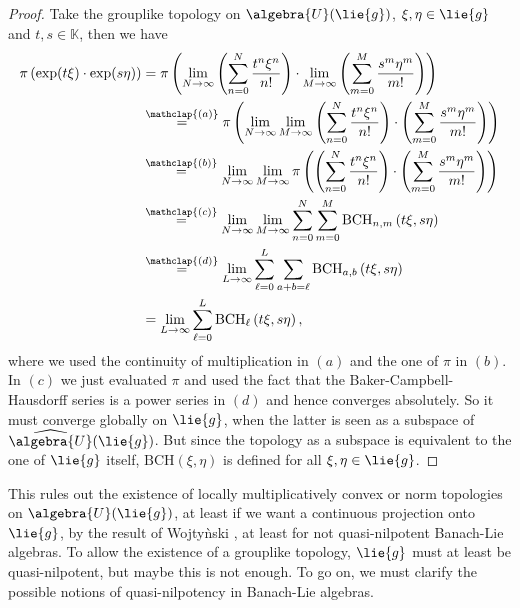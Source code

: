 \documentclass[
11pt,                          %
english                        %
]{article}
\newcommand{\bch}[2]{\mathrm{BCH}\left(#1, #2\right)}
\newcommand{\bchpart}[3]{\mathrm{BCH}_{#1}\left(#2, #3\right)}
\newcommand{\bchparts}[4]{\mathrm{BCH}_{#1, #2}\left(#3, #4\right)}
\newcommand\ot[2]{\stackrel{\mathclap{#1}}{#2}}
\begin{document}
\begin{proof}
	Take the grouplike topology on $\algebra{U}(\lie{g})$, $\xi, \eta \in \lie{g}$ 
	and $t,s \in \mathbb{K}$, then we have
	\begin{align*}
		\pi \left( \exp(t \xi) \cdot \exp(s \eta) \right)
		& =
		\pi
		\left(
			\lim_{N \rightarrow \infty}
			\left(
				\sum\limits_{n=0}^N
				\frac{t^n \xi^n}{n!}
			\right)
			\cdot
			\lim_{M \rightarrow \infty}
			\left(
				\sum\limits_{m=0}^M
				\frac{s^m \eta^m}{m!}
			\right)
		\right)
		\\
		& \ot{(a)}{=}
		\pi
		\left(
			\lim_{N \rightarrow \infty}
			\lim_{M \rightarrow \infty}
			\left(
				\sum\limits_{n=0}^N
				\frac{t^n \xi^n}{n!}
			\right)
			\cdot
			\left(
				\sum\limits_{m=0}^M
				\frac{s^m \eta^m}{m!}
			\right)
		\right)
		\\
		& \ot{(b)}{=}
		\lim_{N \rightarrow \infty}
		\lim_{M \rightarrow \infty}
		\pi
		\left(	
			\left(
				\sum\limits_{n=0}^N
				\frac{t^n \xi^n}{n!}
			\right)
			\cdot
			\left(
				\sum\limits_{m=0}^M
				\frac{s^m \eta^m}{m!}
			\right)
		\right)
		\\
		& \ot{(c)}{=}
		\lim_{N \rightarrow \infty}
		\lim_{M \rightarrow \infty}
		\sum\limits_{n=0}^{N}
		\sum\limits_{m=0}^{M}
		\bchparts{n}{m}{t \xi}{s \eta}
		\\
		& \ot{(d)}{=}
		\lim_{L \rightarrow \infty}
		\sum\limits_{\ell=0}^{L}
		\sum\limits_{a + b = \ell}
		\bchparts{a}{b}{t \xi}{s \eta}
		\\
		& =
		\lim_{L \rightarrow \infty}
		\sum\limits_{\ell=0}^{L}
		\bchpart{\ell}{t \xi}{s \eta},
	\end{align*}
	where we used the continuity of multiplication in $(a)$ and the one of $\pi$ in 
	$(b)$. In $(c)$ we just evaluated $\pi$ and used the fact that the 
	Baker-Campbell-Hausdorff series is a power series in $(d)$ and hence converges 
	absolutely. So it must converge globally on $\lie{g}$, when the latter is seen 
	as a subspace of $\widehat{\algebra{U}}(\lie{g})$. But since the topology as a 
	subspace is equivalent to the one of $\lie{g}$ itself, $\bch{\xi}{\eta}$ is 
	defined for all $\xi, \eta \in \lie{g}$.
\end{proof}
This rules out the existence of locally multiplicatively convex or norm topologies 
on $\algebra{U}(\lie{g})$, at least if we want a continuous projection onto 
$\lie{g}$, by the result of Wojty{\`n}ski \cite{wojtynski:1998a}, at least for not 
quasi-nilpotent Banach-Lie algebras. To allow the existence of a grouplike topology, 
$\lie{g}$ must at least be quasi-nilpotent, but maybe this is not enough. To go on, 
we must clarify the possible notions of quasi-nilpotency in Banach-Lie algebras. 
\end{document}
